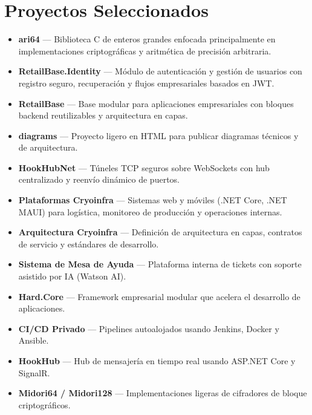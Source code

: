 \section*{Proyectos Seleccionados}

\begin{itemize}[leftmargin=12pt]
    \item \textbf{ari64} — Biblioteca C de enteros grandes enfocada principalmente en implementaciones criptográficas y aritmética de precisión arbitraria.
    \item \textbf{RetailBase.Identity} — Módulo de autenticación y gestión de usuarios con registro seguro, recuperación y flujos empresariales basados en JWT.
    \item \textbf{RetailBase} — Base modular para aplicaciones empresariales con bloques backend reutilizables y arquitectura en capas.
    \item \textbf{diagrams} — Proyecto ligero en HTML para publicar diagramas técnicos y de arquitectura.
    \item \textbf{HookHubNet} — Túneles TCP seguros sobre WebSockets con hub centralizado y reenvío dinámico de puertos.
    \item \textbf{Plataformas Cryoinfra} — Sistemas web y móviles (.NET Core, .NET MAUI) para logística, monitoreo de producción y operaciones internas.
    \item \textbf{Arquitectura Cryoinfra} — Definición de arquitectura en capas, contratos de servicio y estándares de desarrollo.
    \item \textbf{Sistema de Mesa de Ayuda} — Plataforma interna de tickets con soporte asistido por IA (Watson AI).
    \item \textbf{Hard.Core} — Framework empresarial modular que acelera el desarrollo de aplicaciones.
    \item \textbf{CI/CD Privado} — Pipelines autoalojados usando Jenkins, Docker y Ansible.
    \item \textbf{HookHub} — Hub de mensajería en tiempo real usando ASP.NET Core y SignalR.
    \item \textbf{Midori64 / Midori128} — Implementaciones ligeras de cifradores de bloque criptográficos.
\end{itemize}
